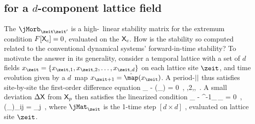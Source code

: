 \subsection{{\HillDet} for a $d$-component lattice field}
\label{s:LC21notHill}   %

The {\jacobianOrb} $\jMorb_{\zeit\zeit'}$  is a
high-\dmn\ linear stability matrix for the extremum condition
$F[\mathsf{X}_c]=0$, evaluated on the {\lattstate} $\mathsf{X}_c$. How is the stability
so computed related to the conventional dynamical systems'
forward-in-time stability? To motivate the answer in its generality,
consider a temporal lattice with a set of $d$ fields
$\ssp_{\zeit}=\{\ssp_{\zeit,1},\ssp_{\zeit,2},\dots,\ssp_{\zeit,d}\}$ on
each lattice site $\zeit$, and time evolution given by a $d$\dmn\ map
$\ssp_{\zeit+1}=\hat{\map}(\ssp_{\zeit})$.
A period-${||}$ {\lattstate}  thus
satisfies site-by-site the first-order difference equation
\beq
\ssp_{\zeit} - \hat{\map}(\ssp_{}) = 0
    \,,\qquad
{},2,\cdots,\cl{}
\,.
A small deviation $\Delta\mathsf{X}$ from $\mathsf{X}_p$ then satisfies the linearized condition
\beq
\Delta\ssp_{\zeit} - \shift^{-1}\jMat_{\zeit}\,\Delta\ssp_{\zeit} = 0
\,,\qquad
(\jMat_{\zeit})_{ij}
=
             {\partial \ssp_j                }
\,,
where $\jMat_{\zeit}$ is the 1-time step $[d\!\times\!{d}]$
\jacobianM, evaluated on lattice site $\zeit$.

